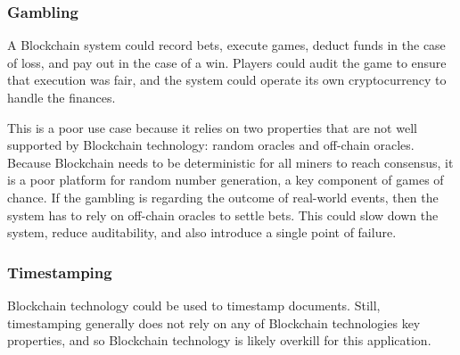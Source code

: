 \subsubsection{Gambling}
A Blockchain system could record bets, execute games, deduct funds in the case of loss, and pay out in the case of a win.
Players could audit the game to ensure that execution was fair, and the system could operate its own cryptocurrency to handle the finances.

This is a poor use case because it relies on two properties that are not well supported by Blockchain technology: random oracles and off-chain oracles.
Because Blockchain needs to be deterministic for all miners to reach consensus, it is a poor platform for random number generation, a key component of games of chance.
If the gambling is regarding the outcome of real-world events, then the system has to rely on off-chain oracles to settle bets. This could slow down the system, reduce auditability, and also introduce a single point of failure.

\subsubsection{Timestamping}
Blockchain technology could be used to timestamp documents. Still, timestamping generally does not rely on any of Blockchain technologies key properties, and so Blockchain technology is likely overkill for this application.